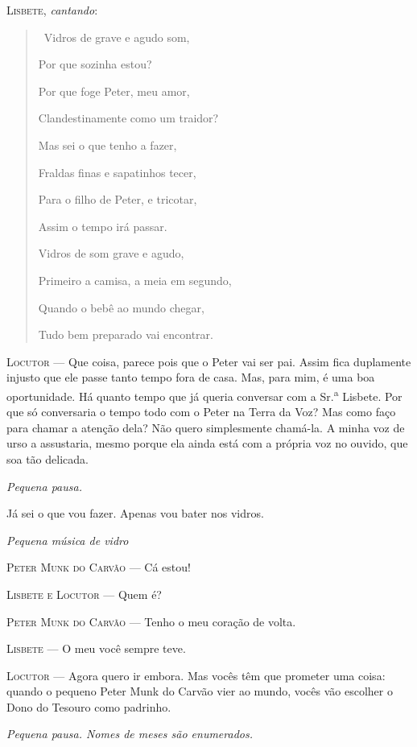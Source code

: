 \textsc{Lisbete}, \emph{cantando}:

\begin{quote}
\quad \, Vidros de grave e agudo som, \smallskip

Por que sozinha estou? \smallskip

Por que foge Peter, meu amor, \smallskip

Clandestinamente como um traidor? \smallskip

Mas sei o que tenho a fazer, \smallskip

Fraldas finas e sapatinhos tecer, \smallskip

Para o filho de Peter, e tricotar, \smallskip

Assim o tempo irá passar. \smallskip

Vidros de som grave e agudo, \smallskip

Primeiro a camisa, a meia em segundo, \smallskip

Quando o bebê ao mundo chegar, \smallskip

Tudo bem preparado vai encontrar. \smallskip

\end{quote}

\textsc{Locutor} --- Que coisa, parece pois que o Peter vai ser pai. Assim fica
duplamente injusto que ele passe tanto tempo fora de casa. Mas, para
mim, é uma boa oportunidade. Há quanto tempo que já queria conversar com
a Sr.\textsuperscript{a} Lisbete. Por que só conversaria o tempo todo
com o Peter na Terra da Voz? Mas como faço para chamar a atenção dela?
Não quero simplesmente chamá-la. A minha voz de urso a assustaria, mesmo
porque ela ainda está com a própria voz no ouvido, que soa tão delicada.

\emph{Pequena pausa.}

Já sei o que vou fazer. Apenas vou bater nos vidros.

\emph{Pequena música de vidro}

\textsc{Peter Munk do Carvão} --- Cá estou!

\textsc{Lisbete e Locutor} --- Quem é?

\textsc{Peter Munk do Carvão} --- Tenho o meu coração de volta.

\textsc{Lisbete} --- O meu você sempre teve.

\textsc{Locutor} --- Agora quero ir embora. Mas vocês têm que prometer uma coisa:
quando o pequeno Peter Munk do Carvão vier ao mundo, vocês vão escolher
o Dono do Tesouro como padrinho.

\emph{Pequena pausa. Nomes de meses são enumerados.}

